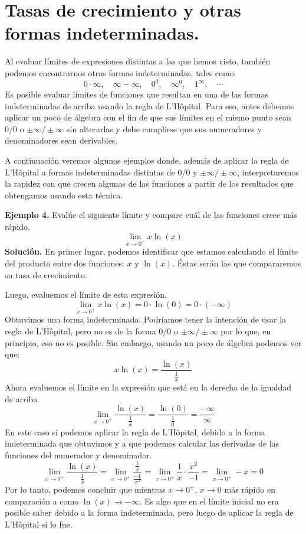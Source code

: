 \documentclass[12pt]{article}
\begin{document}
\section{Tasas de crecimiento y otras formas indeterminadas.}

Al evaluar límites de expresiones distintas a las que hemos visto, también podemos encontrarnos otras formas indeterminadas, tales como:
\[
  0 \cdot \infty, \quad \infty - \infty, \quad 0^{0}, \quad \infty^{0}, \quad 1^{\infty}, \quad \cdots
\]
Es posible evaluar límites de funciones que resultan en una de las formas indeterminadas de arriba usando la regla de L'Hôpital. Para eso, antes debemos aplicar un poco de álgebra con el fin de que sus límites en el mismo punto sean $0/0$ o $\pm \infty / \pm \infty$ sin alterarlas y debe cumplirse que sus numeradores y denominadores sean derivables.

A continuación veremos algunos ejemplos donde, además de aplicar la regla de L'Hôpital a formas indeterminadas distintas de $0/0$ y $\pm \infty / \pm \infty$, interpretaremos la rapidez con que crecen algunas de las funciones a partir de los resultados que obtengamos usando esta técnica.

\textbf{Ejemplo 4.} Evalúe el siguiente límite y compare cuál de las funciones crece más rápido.
\[
  \lim_{x \to 0^{+}} x \ln(x)
\]
\textbf{Solución.} En primer lugar, podemos identificar que estamos calculando el límite del producto entre dos funciones: $x$ y $\ln(x)$. Éstas serán las que compararemos su tasa de crecimiento.

Luego, evaluemos el límite de esta expresión.
\[
  \lim_{x \to 0^{+}} x \ln(x) = 0 \cdot \ln(0) = 0 \cdot (-\infty)
\]
Obtuvimos una forma indeterminada. Podríamos tener la intención de usar la regla de L'Hôpital, pero no es de la forma $0/0$ o $\pm \infty / \pm \infty$ por lo que, en principio, eso no es posible. Sin embargo, usando un poco de álgebra podemos ver que:
\[
  x \ln(x) = \frac{\ln(x)}{\displaystyle \frac{1}{x}}
\]
Ahora evaluemos el límite en la expresión que está en la derecha de la igualdad de arriba.
\[
  \lim_{x \to 0^{+}} \frac{\ln(x)}{\displaystyle \frac{1}{x}} = \frac{\ln(0)}{\displaystyle \frac{1}{0}} = \frac{- \infty}{\infty}
\]
En este caso sí podemos aplicar la regla de L'Hôpital, debido a la forma indeterminada que obtuvimos y a que podemos calcular las derivadas de las funciones del numerador y denominador.
\[
  \lim_{x \to 0^{+}} \frac{\ln(x)}{\displaystyle \frac{1}{x}} = \lim_{x \to 0^{+}} \frac{\displaystyle \frac{1}{x}}{\displaystyle \frac{-1}{x^{2}}}
                                                              = \lim_{x \to 0^{+}} \frac{1}{x} \cdot \frac{x^{2}}{-1}
                                                              = \lim_{x \to 0^{+}} -x
                                                              = 0
\]
Por lo tanto, podemos concluir que mientras $x \to 0^{+}$, $x \to 0$ más rápido en comparación a como $\ln(x) \to -\infty$. Es algo que en el límite inicial no era posible saber debido a la forma indeterminada, pero luego de aplicar la regla de L'Hôpital sí lo fue.
\end{document}
